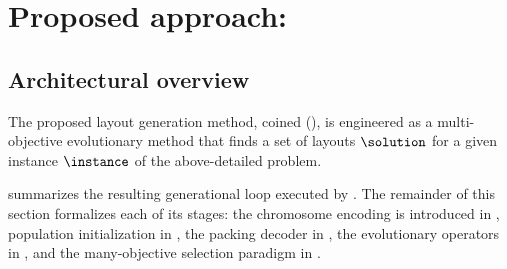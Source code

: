 \section{Proposed approach: \methodNameGeneral}
\label{sec:evopagegen-approach}

\subsection{Architectural overview}
\label{sec:method-overview}

The proposed layout generation method, coined \methodNameGeneralLong (\methodNameGeneral), is engineered as a multi-objective evolutionary method that finds a set of layouts $\solution$ for a given instance $\instance$ of the above-detailed problem.

 summarizes the resulting generational loop executed by \methodNameGeneral. The remainder of this section formalizes each of its stages: the chromosome encoding is introduced in , population initialization in , the packing decoder in , the evolutionary operators in , and the many-objective selection paradigm in .

